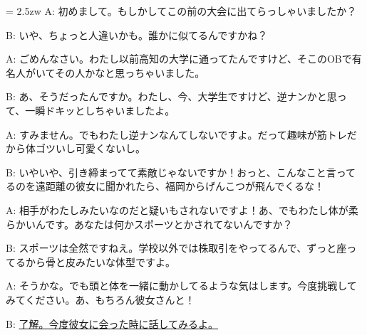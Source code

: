\documentclass[11pt]{amsart}
\title{}
\author{}
\newenvironment{hangall}[1]{\hangindent = 2.5zw\everypar{\hangindent = 2.5zw}}{}
\begin{document}
\maketitle
\begin{hangall}{}%
A: 初めまして。もしかしてこの前の大会に出てらっしゃいましたか？

B: いや、ちょっと人違いかも。誰かに似てるんですかね？

A: ごめんなさい。わたし以前高知の大学に通ってたんですけど、そこのOBで有名人がいてその人かなと思っちゃいました。

B: あ、そうだったんですか。わたし、今、大学生ですけど、逆ナンかと思って、一瞬ドキッとしちゃいましたよ。

A: すみません。でもわたし逆ナンなんてしないですよ。だって趣味が筋トレだから体ゴツいし可愛くないし。

B: いやいや、引き締まってて素敵じゃないですか！おっと、こんなこと言ってるのを遠距離の彼女に聞かれたら、福岡からげんこつが飛んでくるな！

A: 相手がわたしみたいなのだと疑いもされないですよ！あ、でもわたし体が柔らかいんです。あなたは何かスポーツとかされてないんですか？

B: スポーツは全然ですねえ。学校以外では株取引をやってるんで、ずっと座ってるから骨と皮みたいな体型ですよ。

A: そうかな。でも頭と体を一緒に動かしてるような気はします。今度挑戦してみてください。あ、もちろん彼女さんと！

B: \ul{了解。今度彼女に会った時に話してみるよ。}\end{hangall}
\end{document}

